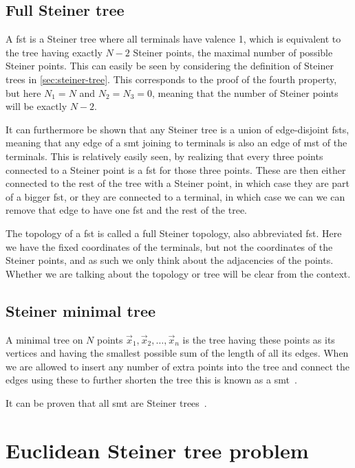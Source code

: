 \subsection{Full Steiner tree}
\label{sec:full-steiner-tree}

A \gls{fst} is a Steiner tree where all terminals have valence 1, which is
equivalent to the tree having exactly $N-2$ Steiner points, the maximal number
of possible Steiner points.  This can easily be seen by considering the
definition of Steiner trees in \cref{sec:steiner-tree}.  This corresponds to the
proof of the fourth property, but here $N_1 = N$ and $N_2 = N_3 = 0$, meaning
that the number of Steiner points will be exactly $N-2$.

It can furthermore be shown that any Steiner tree is a union of edge-disjoint
\glspl{fst}, meaning that any edge of a \gls{smt} joining to terminals is
also an edge of \gls{mst} of the terminals.  This is relatively easily seen,
by realizing that every three points connected to a Steiner point is a \gls{fst}
for those three points.  These are then either connected to the rest of the tree
with a Steiner point, in which case they are part of a bigger \gls{fst}, or they
are connected to a terminal, in which case we can we can remove that edge
to have one \gls{fst} and the rest of the tree.

The topology of a \gls{fst} is called a full Steiner topology, also abbreviated
\gls{fst}.  Here we have the fixed coordinates of the terminals, but not the
coordinates of the Steiner points, and as such we only think about the
adjacencies of the points.  Whether we are talking about the topology or tree
will be clear from the context.

\subsection{Steiner minimal tree}
\label{sec:steiner-minimal-tree}

A minimal tree on $N$ points $\vec{x}_{1},\vec{x}_{2},\ldots,\vec{x}_{n}$ is the
tree having these points as its vertices and having the smallest possible sum of
the length of all its edges.  When we are allowed to insert any number of extra
points into the tree and connect the edges using these to further shorten the
tree this is known as a \gls{smt}~\cite{Gilbert1968}.

It can be proven that all \gls{smt} are Steiner trees~\cite{Smith1992}.

\section{Euclidean Steiner tree problem}
\label{sec:eucl-stein-tree}

